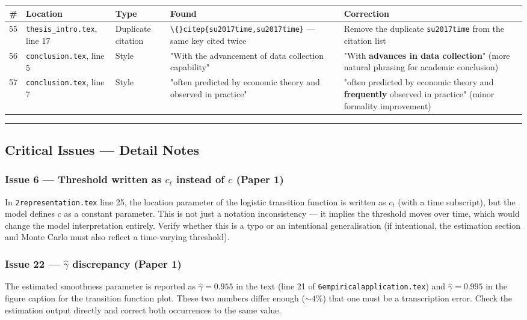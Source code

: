 \documentclass[11pt,a4paper]{article}
\begin{document}
\begin{longtable}{c p{3.2cm} l p{3.8cm} p{3.5cm}}
\toprule
\textbf{\#} & \textbf{Location} & \textbf{Type} & \textbf{Found} & \textbf{Correction} \\
\midrule
\endhead
55 & \texttt{thesis\_intro.tex}, line 17 & Duplicate citation & \texttt{\textbackslash\{\}citep\{su2017time,su2017time\}} — same key cited twice & Remove the duplicate \texttt{su2017time} from the citation list \\
56 & \texttt{conclusion.tex}, line 5 & Style & "With the advancement of data collection capability" & "With \textbf{advances in data collection}" (more natural phrasing for academic conclusion) \\
57 & \texttt{conclusion.tex}, line 7 & Style & "often predicted by economic theory and observed in practice" & "often predicted by economic theory and \textbf{frequently} observed in practice" (minor formality improvement) \\
\bottomrule
\end{longtable}


\medskip\hrule\medskip

\subsection*{Critical Issues — Detail Notes}

\subsubsection*{Issue 6 — Threshold written as $c_t$ instead of $c$ (Paper 1)}

In \texttt{2representation.tex} line 25, the location parameter of the logistic transition function is written as $c_t$ (with a time subscript), but the model defines $c$ as a constant parameter. This is not just a notation inconsistency — it implies the threshold moves over time, which would change the model interpretation entirely. Verify whether this is a typo or an intentional generalisation (if intentional, the estimation section and Monte Carlo must also reflect a time-varying threshold).

\subsubsection*{Issue 22 — $\hat{\gamma}$ discrepancy (Paper 1)}

The estimated smoothness parameter is reported as $\hat{\gamma}=0.955$ in the text (line 21 of \texttt{6empiricalapplication.tex}) and $\hat{\gamma}=0.995$ in the figure caption for the transition function plot. These two numbers differ enough ($\sim4\%$) that one must be a transcription error. Check the estimation output directly and correct both occurrences to the same value.
\end{document}

